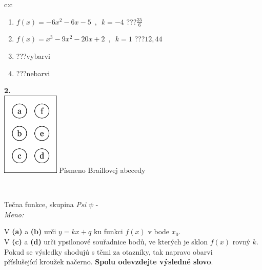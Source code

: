 \documentclass[10pt]{report}
\begin{document}
\begin{tabular}{c:c}
\begin{minipage}[c][104.5mm][t]{0.5\linewidth}
\begin{center}
\begin{minipage}{0.79\linewidth}
\begin{center}
\begin{varwidth}{\linewidth}
\begin{enumerate}
\item $f(x)=-6x^2-6x-5\enspace , \enspace k=-4$\quad \dotfill\; ???\;\dotfill \quad $\frac{35}{6}$
\item $f(x)=x^3-9x^2-20x+2\enspace , \enspace k=1$\quad \dotfill\; ???\;\dotfill \quad $12 , 44$
\item \quad \dotfill\; ???\;\dotfill \quad vybarvi
\item \quad \dotfill\; ???\;\dotfill \quad nebarvi
\end{enumerate}
\end{varwidth}
\end{center}
\end{minipage}
\begin{minipage}{0.20\linewidth}
\begin{center}
{\Huge\bfseries 2.} \\[2mm]
\includegraphics[height=40mm]{../images/braille.png}
{\small Písmeno Braillovej abecedy}
\end{center}
\end{minipage}
\end{center}
\end{minipage}
\\ \hdashline
\begin{minipage}[c][104.5mm][t]{0.5\linewidth}
\begin{center}
\vspace{7mm}
{\huge Tečna funkce, skupina \textit{Psi $\psi$} -}\\[5mm]
\textit{Meno:}\phantom{xxxxxxxxxxxxxxxxxxxxxxxxxxxxxxxxxxxxxxxxxxxxxxxxxxxxxxxxxxxxxxxxx}\\[5mm]
\begin{minipage}{0.95\linewidth}
\begin{center}
V \textbf{(a)} a \textbf{(b)} urči  $y = kx + q$ ku funkci $f(x)$ v bode $x_0$.\\V \textbf{(c)} a \textbf{(d)} urči ypsilonové souřadnice bodů, ve kterých je sklon $f(x)$ rovný $k$.\\Pokud se výsledky shodujú s těmi za otazníky, tak napravo obarvi\\příslušející kroužek načerno. \textbf{Spolu odevzdejte výsledné slovo}.

\end{center}
\end{minipage}
\end{center}
\end{minipage}
\end{tabular}
\end{document}
